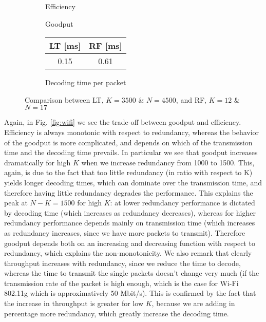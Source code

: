 \begin{figure}[!h]
\centering
\begin{subfigure}{0.23\textwidth}
	\captionsetup{justification=centering,font=scriptsize}
	\centering
	\setlength\fwidth{\textwidth}
	\setlength{}
	
	\caption{Efficiency}
	\label{fig:RF_eff}
\end{subfigure}\hspace{2em}%
\begin{subfigure}{0.23\textwidth}
	\captionsetup{justification=centering,font=scriptsize}
	\centering
	\setlength\fwidth{\textwidth}
	\setlength{}
	
	\caption{Goodput}
	\label{fig:RF_good}
\end{subfigure}\hspace{2em}%
\begin{subfigure}{0.23\textwidth}
	\captionsetup{justification=centering,font=scriptsize}
	\small
	\centering
	\begin{tabular}[c]{c|c}
		LT [ms] & RF [ms] \\ \hline
		0.15 & 0.61 \\
	\end{tabular}
	\caption{Decoding time per packet}
	\label{fig:RFLT_dectime}
\end{subfigure}
\caption{Comparison between LT, $K=3500$ \& $N=4500$, and RF, $K=12$ \& $N=17$}
\label{fig:RFLT}
\end{figure}


Again, in Fig. \ref{fig:wifi} we see the trade-off between goodput and efficiency. Efficiency is always monotonic with respect to redundancy, whereas the behavior of the goodput is more complicated, and depends on which of the transmission time and the decoding time prevails. In particular we see that goodput increases dramatically for high $K$ when we increase redundancy from 1000 to 1500. This, again, is due to the fact that too little redundancy (in ratio with respect to K) yields longer decoding times, which can dominate over the transmission time, and therefore having little redundancy degrades the performance. This explains the peak at $N-K=1500$ for high $K$: at lower redundancy performance is dictated by decoding time (which increases as redundancy decreases), whereas for higher redundancy performance depends mainly on transmission time (which increases as redundancy increases, since we have more packets to transmit). Therefore goodput depends both on an increasing and decreasing function with respect to redundancy, which explains the non-monotonicity.  We also remark that clearly throughput increases with redundancy, since we reduce the time to decode, whereas the time to transmit the single packets doesn't change very much (if the transmission rate of the packet is high enough, which is the case for Wi-Fi 802.11g which is approximatively 50 Mbit/s). This is confirmed by the fact that the increase in throughput is greater for low $K$, because we are adding in percentage more redundancy, which greatly increase the decoding time. 

